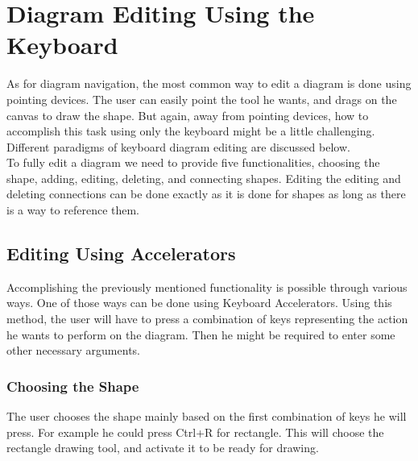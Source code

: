
\section{Diagram Editing Using the Keyboard}
As for diagram navigation, the most common way to edit a diagram is done using pointing devices. The user can easily point the tool he wants, and drags on the canvas to draw the shape. But again, away from pointing devices, how to accomplish this task using only the keyboard might be a little challenging. Different paradigms of keyboard diagram editing are discussed below.\\
To fully edit a diagram we need to provide five functionalities, choosing the shape, adding, editing, deleting, and connecting shapes. Editing the editing and deleting connections can be done exactly as it is done for shapes as long as there is a way to reference them.

\subsection{Editing Using Accelerators}
Accomplishing the previously mentioned functionality is possible through various ways. One of those ways can be done using Keyboard Accelerators. Using this method, the user will have to press a combination of keys representing the action he wants to perform on the diagram. Then he might be required to enter some other necessary arguments.


\subsubsection {Choosing the Shape}
The user chooses the shape mainly based on the first combination of keys he will press. For example he could press Ctrl+R for rectangle. This will choose the rectangle drawing tool, and activate it to be ready for drawing.

